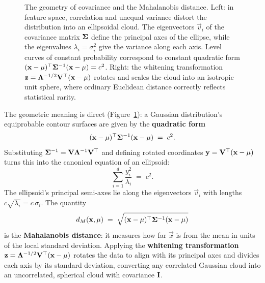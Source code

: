 \begin{figure}[H]
\caption{The geometry of covariance and the Mahalanobis distance. Left: in feature space, correlation and unequal variance distort the distribution into an ellipsoidal cloud. The eigenvectors $\vec{v}_i$ of the covariance matrix $\mathbf{\Sigma}$ define the principal axes of the ellipse, while the eigenvalues $\lambda_i = \sigma_i^2$ give the variance along each axis. Level curves of constant probability correspond to constant quadratic form $(\mathbf{x}-\mathbf{\mu})^\top\mathbf{\Sigma}^{-1}(\mathbf{x}-\mathbf{\mu})=c^2$. Right: the whitening transformation $\mathbf{z} = \mathbf{\Lambda}^{-1/2}\mathbf{V}^\top(\mathbf{x}-\mathbf{\mu})$ rotates and scales the cloud into an isotropic unit sphere, where ordinary Euclidean distance correctly reflects statistical rarity.}
\label{ch42:fig-covariance}
\end{figure}

The geometric meaning is direct (Figure~\ref{ch42:fig-covariance}):
a Gaussian distribution's equiprobable contour surfaces are given by the \textbf{quadratic form}
\begin{equation}
\label{ch42:eq-quad-form}
  (\mathbf{x}-\mathbf{\mu})^\top \mathbf{\Sigma}^{-1} (\mathbf{x}-\mathbf{\mu}) \;=\; c^2.
\end{equation}
Substituting $\mathbf{\Sigma}^{-1} = \mathbf{V}\mathbf{\Lambda}^{-1}\mathbf{V}^\top$ and defining rotated coordinates
$\mathbf{y} = \mathbf{V}^\top(\mathbf{x}-\mathbf{\mu})$ turns this into the canonical equation of an ellipsoid:
\[
  \sum_{i=1}^{d} \frac{y_i^2}{\lambda_i} \;=\; c^2.
\]
The ellipsoid's principal semi-axes lie along the eigenvectors $\vec{v}_i$ with lengths $c\sqrt{\lambda_i} = c\,\sigma_i$.
The quantity
\[
  d_M(\mathbf{x}, \mathbf{\mu}) \;=\; \sqrt{(\mathbf{x}-\mathbf{\mu})^\top \mathbf{\Sigma}^{-1} (\mathbf{x}-\mathbf{\mu})}
\]
is the \textbf{Mahalanobis distance}: it measures how far $\vec{x}$ is from the mean in units of the
local standard deviation. Applying the \textbf{whitening transformation}
$\mathbf{z} = \mathbf{\Lambda}^{-1/2}\mathbf{V}^\top(\mathbf{x}-\mathbf{\mu})$ rotates the data to align with its
principal axes and divides each axis by its standard deviation, converting any correlated Gaussian
cloud into an uncorrelated, spherical cloud with covariance $\mathbf{I}$.

